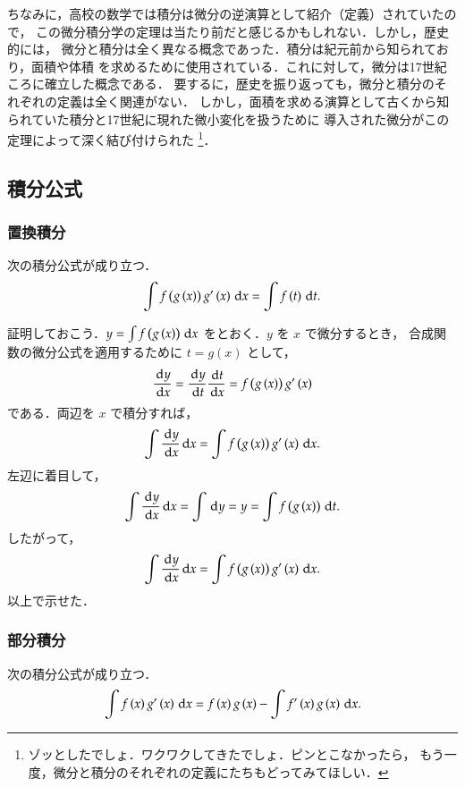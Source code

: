         ちなみに，高校の数学では積分は微分の逆演算として紹介（定義）されていたので，
        この微分積分学の定理は当たり前だと感じるかもしれない．しかし，歴史的には，
        微分と積分は全く異なる概念であった．積分は紀元前から知られており，面積や体積
        を求めるために使用されている．これに対して，微分は17世紀ころに確立した概念である．
        要するに，歴史を振り返っても，微分と積分のそれぞれの定義は全く関連がない．
        しかし，面積を求める演算として古くから知られていた積分と17世紀に現れた微小変化を扱うために
        導入された微分がこの定理によって深く結び付けられた
        \footnote{
            ゾッとしたでしょ．ワクワクしてきたでしょ．ピンとこなかったら，
            もう一度，微分と積分のそれぞれの定義にたちもどってみてほしい．
        }．


        \subsection{積分公式}
        \subsubsection{置換積分}
        次の積分公式が成り立つ．
        \begin{align}
            \int f\left( g\left(x\right) \right) g^{\prime}\left(x\right) \,\mathrm{d} x= \int f\left(t\right) \,\mathrm{d} t.
        \end{align}
        
        証明しておこう．$y=\int f\left( g\left(x\right) \right) \,\mathrm{d} x$ をとおく．$y$ を $x$ で微分するとき，
        合成関数の微分公式を適用するために $t=g\left(x\right)$ として，
        \[
            \frac{\,\mathrm{d} y}{\,\mathrm{d} x} = \frac{\,\mathrm{d} y}{\,\mathrm{d} t}\frac{\,\mathrm{d} t}{\,\mathrm{d} x} = f\left( g\left(x\right) \right) g^{\prime}\left(x\right)
        \]
        である．両辺を $x$ で積分すれば，
        \[
            \int \frac{\,\mathrm{d} y}{\,\mathrm{d} x} \,\mathrm{d} x = \int f\left( g\left(x\right) \right) g^{\prime}\left(x\right) \,\mathrm{d} x.
        \]
        左辺に着目して，
        \[
            \int \frac{\,\mathrm{d} y}{\,\mathrm{d} x} \,\mathrm{d} x = \int \,\mathrm{d} y = y = \int f\left( g\left(x\right) \right) \,\mathrm{d} t.
        \]
        したがって，
        \[
            \int \frac{\,\mathrm{d} y}{\,\mathrm{d} x} \,\mathrm{d} x = \int f\left( g\left(x\right) \right) g^{\prime}\left(x\right) \,\mathrm{d} x.
        \]
        以上で示せた．

        \subsubsection{部分積分}
        次の積分公式が成り立つ．
        \begin{align}
            \int f\left( x \right) g^{\prime}\left(x\right) \,\mathrm{d} x
            = f\left(x\right) g\left(x\right) - \int f^{\prime}\left(x\right) g\left(x\right) \,\mathrm{d} x.
        \end{align}


